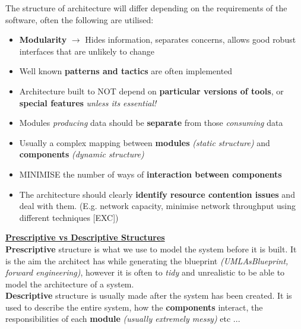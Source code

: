 \documentclass[a4paper]{article}
\begin{document}
The structure of architecture will differ depending on the requirements of the software, often the following are utilised:
\begin{itemize}
\item \textbf{Modularity} $\rightarrow$ Hides information, separates concerns, allows good robust interfaces that are unlikely to change
\item Well known \textbf{patterns and tactics} are often implemented
\item Architecture built to NOT depend on \textbf{particular versions of tools}, or \textbf{special features} \textit{unless its essential!}
\item Modules \textit{producing} data should be \textbf{separate} from those \textit{consuming} data
\item Usually a complex mapping between \textbf{modules} \textit{(static structure)} and \textbf{components} \textit{(dynamic structure)}
\item MINIMISE the number of ways of \textbf{interaction between components}
\item The architecture should clearly \textbf{identify resource contention issues} and deal with them. (E.g. network capacity, minimise network throughput using different techniques [EXC])\\
\end{itemize}

\underline{\textbf{Prescriptive vs Descriptive Structures}}\\
\textbf{Prescriptive} structure is what we use to model the system before it is built. It is the aim the architect has while generating the blueprint \textit{(UMLAsBlueprint, forward engineering)}, however it is often to \textit{tidy} and unrealistic to be able to model the architecture of a system.\\

\textbf{Descriptive} structure is usually made after the system has been created. It is used to describe the entire system, how the \textbf{components} interact, the responsibilities of each \textbf{module} \textit{(usually extremely messy)} etc ...
\end{document}
